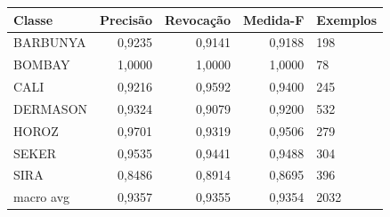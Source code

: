 \begin{tabular}{lrrrl}
\toprule
Classe & Precisão & Revocação & Medida-F & Exemplos \\
\midrule
BARBUNYA & 0,9235 & 0,9141 & 0,9188 & 198 \\
BOMBAY & 1,0000 & 1,0000 & 1,0000 & 78 \\
CALI & 0,9216 & 0,9592 & 0,9400 & 245 \\
DERMASON & 0,9324 & 0,9079 & 0,9200 & 532 \\
HOROZ & 0,9701 & 0,9319 & 0,9506 & 279 \\
SEKER & 0,9535 & 0,9441 & 0,9488 & 304 \\
SIRA & 0,8486 & 0,8914 & 0,8695 & 396 \\
macro avg & 0,9357 & 0,9355 & 0,9354 & 2032 \\
\bottomrule
\end{tabular}
